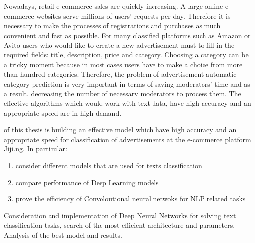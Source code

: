 {\actuality}

Nowadays, retail e-commerce sales are quickly increasing. A large online e-commerce
websites serve millions of users’ requests per day. Therefore it is necessary to make the processes of registrations and purchases as much convenient and fast as possible. For many classified platforms such as Amazon or Avito users who would like to create a new advertisement must to fill in the required fields: title, description, price and category. Choosing a category can be a tricky moment because in most cases users have to make a choice from more than hundred categories. Therefore, the problem  of advertisement automatic category prediction is very important in terms of saving moderators' time and as a result, decreasing the number of necessary moderators to process them. The effective algorithms which would work with text data, have high accuracy and an appropriate speed are in high demand.

{\aim} of this thesis is building an effective model which have high accuracy and an appropriate speed for classification of advertisements at the e-commerce platform Jiji.ng. 
In particular:
\begin{enumerate}
	\item consider different models that are used for texts classification 
	\item compare performance of Deep Learning models 
	\item prove the efficiency of Convoloutional neural netwoks for NLP related tasks 
\end{enumerate}


{\novelty}
Consideration and implementation of Deep Neural Networks for solving text classification tasks, search of the most efficient architecture and parameters. Analysis of the best model and results.

%
%
%
%
%
%
